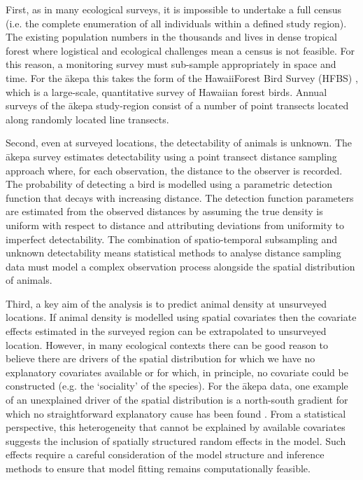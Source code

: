 \documentclass{statsoc}
\newcommand{\akepa}{\textquotesingle\={a}kepa}  %
\newcommand{\hawaii}{Hawai\textquotesingle i}   %
\begin{document}
First, as in many ecological surveys, it is impossible to undertake a full census (i.e. the complete enumeration of all individuals within a defined study region).  The existing population numbers in the thousands and lives in dense tropical forest where logistical and ecological challenges mean a census is not feasible.  For this reason, a monitoring survey must sub-sample appropriately in space and time.  For the \akepa{} this takes the form of the \hawaii Forest Bird Survey (HFBS) \citep{scott_HFBS_1986}, which is a large-scale, quantitative survey of Hawaiian forest birds.  Annual surveys of the \akepa{} study-region consist of a number of point transects located along randomly located line transects.

Second, even at surveyed locations, the detectability of animals is unknown.  The \akepa{} survey estimates detectability using a point transect distance sampling approach \citep{buckland_distance_2015} where, for each observation, the distance to the observer is recorded.  The probability of detecting a bird is modelled using a parametric detection function that decays with increasing distance.  The detection function parameters are estimated from the observed distances by assuming the true density is uniform with respect to distance and attributing deviations from uniformity to imperfect detectability. The combination of spatio-temporal subsampling and unknown detectability means statistical methods to analyse distance sampling data must model a complex observation process alongside the spatial distribution of animals.  

Third, a key aim of the analysis is to predict animal density at unsurveyed locations.  If animal density is modelled using spatial covariates then the covariate effects estimated in the surveyed region can be extrapolated to unsurveyed location.  However, in many ecological contexts there can be good reason to believe there are drivers of the spatial distribution for which we have no explanatory covariates available or for which, in principle, no covariate could be constructed (e.g. the `sociality' of the species).  For the \akepa{} data, one example of an unexplained driver of the spatial distribution is a north-south gradient for which no straightforward explanatory cause has been found \citep{camp_dsm_2020}.  From a statistical perspective, this heterogeneity that cannot be explained by available covariates suggests the inclusion of spatially structured random effects in the model.  Such effects require a careful consideration of the model structure and inference methods to ensure that model fitting remains computationally feasible.
\end{document}
